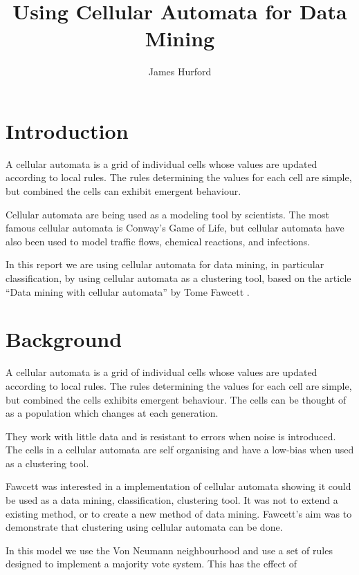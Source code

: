 \documentclass[11pt]{article}
\title{Using Cellular Automata for Data Mining}
\author{James Hurford}
\date{}
\begin{document}
\maketitle

\setcounter{tocdepth}{3}
\tableofcontents
\vspace*{1cm}


\section{Introduction}
\label{sec-1}

  A cellular automata is a grid of individual cells whose values are
  updated according to local rules. The rules determining the values
  for each cell are simple, but combined the cells can exhibit
  emergent behaviour. 

  Cellular automata are being used as a modeling tool by
  scientists. The most famous cellular automata is Conway's Game of
  Life, but cellular automata have also been used to model traffic
  flows, chemical reactions, and infections.

  In this report we are using cellular automata for data mining, in
  particular classification, by using cellular automata as a
  clustering tool, based on the article ``Data mining with cellular
  automata'' by Tome Fawcett \cite{fawcett08}.
\section{Background}
\label{sec-2}

  A cellular automata is a grid of individual cells whose values are
  updated according to local rules. The rules determining the values
  for each cell are simple, but combined the cells exhibits emergent
  behaviour.  The cells can be thought of as a population which
  changes at each generation.

  They work with little data and is resistant to errors when noise is
  introduced.  The cells in a cellular automata are self organising
  and have a low-bias when used as a clustering tool.

  Fawcett \cite{fawcett08} was interested in a implementation of
  cellular automata showing it could be used as a data mining,
  classification, clustering tool.  It was not to extend a existing
  method, or to create a new method of data mining. Fawcett's
  \cite{fawcett08} aim was to demonstrate that clustering using
  cellular automata can be done.

  In this model we use the Von Neumann neighbourhood and use a set of
  rules designed to implement a majority vote system.  This has the
  effect of 
\end{document}
